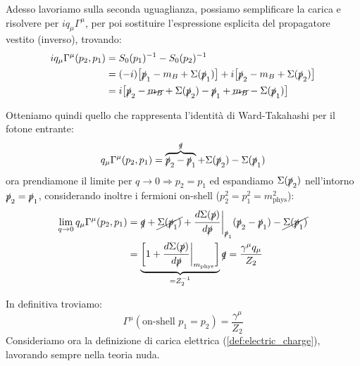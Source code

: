 \documentclass[../main.tex]{subfiles}
\begin{document}
Adesso lavoriamo sulla seconda uguaglianza, possiamo semplificare la carica e risolvere per \(iq_\mu\Gamma^\mu\), per poi sostituire l'espressione esplicita del propagatore vestito (inverso), trovando:
\begin{align*}
    iq_\mu\Gamma^\mu(p_2,p_1) &= S_0(p_1)^{-1} - S_0(p_2)^{-1} \\
                    &= (-i)\bigl[\slashed p_1 - m_B + \Sigma(\slashed p_1) \bigr] +i\bigl[\slashed p_2 - m_B + \Sigma(\slashed p_2) \bigr]\\
                    &=i\bigl[\slashed p_2 - \cancel{m_B} + \Sigma(\slashed p_2) -\slashed p_1 + \cancel{m_B} - \Sigma(\slashed p_1) \bigr]
\end{align*}

Otteniamo quindi quello che rappresenta l'identità di Ward-Takahashi per il fotone entrante:
\begin{equation}
    q_\mu\Gamma^\mu(p_2,p_1) = \overbrace{\slashed p_2 -\slashed p_1}^{\slashed q} + \Sigma(\slashed p_2)  - \Sigma(\slashed p_1)
    \label{eq:entering_photon_contraction}
\end{equation}
ora prendiamone il limite per $q\rightarrow 0 \Rightarrow p_2=p_1$ ed espandiamo $\Sigma(\slashed p_2)$ nell'intorno $\slashed p_2 = \slashed p_1$, considerando inoltre i fermioni on-shell ($p_2^2 = p_1^2 = m^2_\text{phys}$):
\begin{align*}
    \lim_{q\rightarrow 0}q_\mu\Gamma^\mu(p_2,p_1) &= \slashed q + \cancel{\Sigma(\slashed p_1)} + \frac{d\Sigma(\slashed p)}{d\slashed p}\bigg|_{\slashed p_1}(\slashed p_2-\slashed p_1)-\cancel{\Sigma(\slashed p_1)}\\
        &= \underbrace{\biggl[1+ \frac{d\Sigma(\slashed p)}{d\slashed p}\bigg|_{m_\text{phys}}\biggr]}_{=Z_2^{-1}}\slashed q = \frac{\gamma^\mu q_\mu}{Z_2} \\
\end{align*}

In definitiva troviamo:
\begin{equation}
    \boxed{\Gamma^\mu(\text{on-shell } p_1=p_2) = \frac{\gamma^\mu}{Z_2}}
    \label{eq:Gamma_mu_scale}
\end{equation}
Consideriamo ora la definizione di carica elettrica (\ref{def:electric_charge}), lavorando sempre nella teoria nuda.
\end{document}
